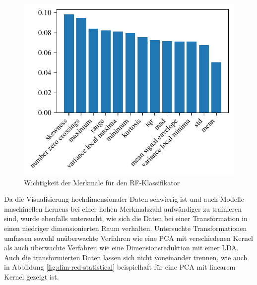 \begin{figure}[H]
	\centering
	\includegraphics[scale=0.95]{pic/rf-cl-statistical.pdf}
	\caption{Wichtigkeit der Merkmale für den \ac{RF}-Klassifikator}
	\label{fig:rf-statistical-importances}
\end{figure}

Da die Visualisierung hochdimensionaler Daten schwierig ist und auch Modelle maschinellen Lernens bei einer hohen Merkmalszahl aufwändiger zu trainieren sind, wurde ebenfalls untersucht, wie sich die Daten bei einer Transformation in einen niedriger dimensionierten Raum verhalten. Untersuchte Transformationen umfassen sowohl unüberwachte Verfahren wie eine \ac{PCA} mit verschiedenen Kernel als auch überwachte Verfahren wie eine Dimensionsreduktion mit einer \ac{LDA}. Auch die transformierten Daten lassen sich nicht voneinander trennen, wie auch in Abbildung \ref{fig:dim-red-statistical} beispielhaft für eine \ac{PCA} mit linearem Kernel gezeigt ist.


